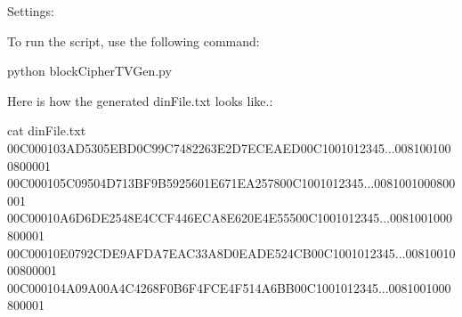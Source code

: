 \documentclass[letterpaper,10pt,english]{sphinxmanual}
\begin{document}
Settings:

\begin{sphinxVerbatim}[commandchars=\\\{\}]
                             
                              
                              
                            
                     
             
                            
     
\end{sphinxVerbatim}

To run the script, use the following command:

\begin{sphinxVerbatim}[commandchars=\\\{\}]
\PYGZdl{} python blockCipherTVGen.py
\end{sphinxVerbatim}

Here is how the generated dinFile.txt looks like.:

\begin{sphinxVerbatim}[commandchars=\\\{\}]
\PYGZdl{} cat dinFile.txt
00C000103AD5305EBD0C99C7482263E2D7ECEAED00C1001012345...0081001000800001
00C000105C09504D713BF9B5925601E671EA257800C1001012345...0081001000800001
00C00010A6D6DE2548E4CCF446ECA8E620E4E55500C1001012345...0081001000800001
00C00010E0792CDE9AFDA7EAC33A8D0EADE524CB00C1001012345...0081001000800001
00C000104A09A00A4C4268F0B6F4FCE4F514A6BB00C1001012345...0081001000800001
\end{sphinxVerbatim}
\end{document}
